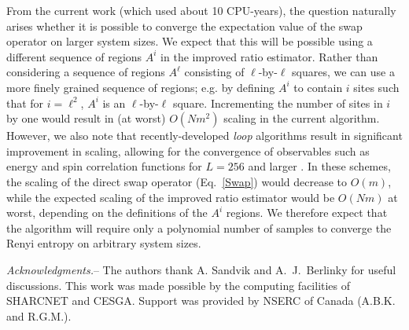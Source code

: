 \documentclass[prl,aps,twocolumn,floatfix,amsmath,amssymb,superscriptaddress,tightenlines]{revtex4}
\begin{document}
From the current work %
(which used about 10 CPU-years), 
the question naturally arises whether it is possible to converge the expectation value of the swap operator on
larger system sizes. 
We expect that this will be possible using a different
sequence of regions $A^i$ in the improved ratio estimator.
Rather than considering a sequence of regions $A^{\ell}$ consisting of $\ell$-by-$\ell$ squares, 
we can use a more finely grained sequence of regions; e.g. by defining $A^i$ to contain
$i$ sites such that for $i=\ell^2$, $A^i$ is an $\ell$-by-$\ell$ square.  Incrementing the number of sites in $i$ by one would result in
(at worst) $O(Nm^2)$ scaling in the current algorithm.  
However, we also note that recently-developed {\it loop} algorithms
result in significant improvement in scaling, allowing for the convergence of observables such as energy and spin correlation functions for $L=256$ and larger \cite{AWSloop}.  In these schemes, the scaling of the direct swap operator (Eq.~\eqref{Swap}) 
would decrease to $O(m)$, while the expected scaling of the improved ratio estimator would be $O(Nm)$ at worst, depending
on the definitions of the $A^i$ regions.
We therefore expect that the algorithm will require only a polynomial number of samples to converge the Renyi entropy on arbitrary system sizes.


{\it Acknowledgments.}-- The authors thank A. Sandvik and A.~J.~Berlinky for useful discussions.
This work was made possible by the
computing facilities of SHARCNET and CESGA.  Support was provided by NSERC
of Canada (A.B.K. and R.G.M.).


\end{document}
